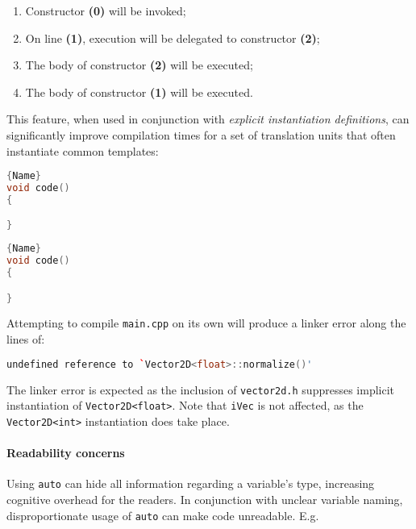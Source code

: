 \documentclass[twoside,10pt,letterpaper,usenames]{newstyle-PearsonGeneric-7-38}
\begin{document}
\begin{enumerate}
\def\labelenumi{\arabic{enumi}.}
\item
  {Constructor} \textbf{(0)} will be invoked;
\item
  On line \textbf{(1)}, execution will be delegated to constructor
  \textbf{(2)};
\item
  The body of constructor \textbf{(2)} will be executed;
\item
  The body of constructor \textbf{(1)} will be executed.
\end{enumerate}

This feature, when used in conjunction with \emph{explicit instantiation
definitions}, can significantly improve compilation times for a set of
translation units that often instantiate common templates:

\noindent\begin{minipage}{.45\textwidth}
\begin{lstlisting}[language=C++, caption=code 1,frame=tb]{Name}
void code()
{

}
\end{lstlisting}
\end{minipage}\hfill
\begin{minipage}{.45\textwidth}
\begin{lstlisting}[language=C++, caption=code 2,frame=tb]{Name}
void code()
{

}
\end{lstlisting}
\end{minipage}

Attempting to compile \texttt{main.cpp} on its own will produce a linker
error along the lines of:

\begin{lstlisting}[language=C++, caption={missing caption}, label={testlabel}, frame=tb]
undefined reference to `Vector2D<float>::normalize()'
\end{lstlisting}
    

The linker error is expected as the inclusion of \texttt{vector2d.h}
suppresses implicit instantiation of \texttt{Vector2D<float>}. Note that
\texttt{iVec} is not affected, as the \texttt{Vector2D<int>}
instantiation does take place.

\paragraph[Readability concerns]{Readability concerns}\label{readability-concerns}

Using \texttt{auto} can hide all information regarding a variable's
type, increasing cognitive overhead for the readers. In conjunction with
unclear variable naming, disproportionate usage of \texttt{auto} can
make code unreadable. E.g.
\end{document}
